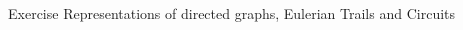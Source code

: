 \begin{frame}[allowframebreaks]{Exercise \thesection}{Representations of directed graphs, Eulerian Trails and Circuits}
\begin{solution}
    \end{solution}
    \begin{exercisenoinc}
      \begin{columns}
        \begin{column}{0.3\textwidth}
        \end{column}
        \begin{column}{0.3\textwidth}
        \end{column}
        \begin{column}{0.4\textwidth}
          \resizebox{\textwidth}{!}{
            \begin{minipage}[t]{8cm}
              \centering
              \[ M(G) := 
                \begin{pmatrix}
                1 & 0 & 0 & 0 & -1 & -1 & \_ \\
                -1 & 1 & 0 & 0 & 0 & 0  & \_ \\
                0 & -1 & 1 & 0 & 0 & 0  & \_ \\
                0 & 0 & -1 & 1 & 1 & 0  & \_ \\
                0 & 0 & 0 & -1 & 0 & 1  & \_ 
              \end{pmatrix}
            \]
            \end{minipage}
          }
        \end{column}
      \end{columns}
    \end{exercisenoinc}
    \begin{solution}
      \begin{columns}
        \begin{column}{0.2\textwidth}
        \end{column}

\end{columns}
\end{solution}
\end{frame}
